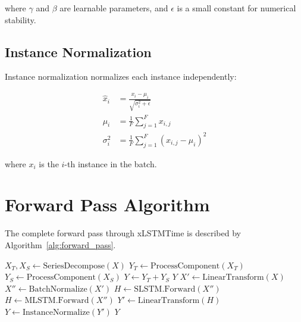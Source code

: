 \documentclass[11pt,a4paper]{article}
\begin{document}
where $\gamma$ and $\beta$ are learnable parameters, and $\epsilon$ is a small constant for numerical stability.

\subsection{Instance Normalization}

Instance normalization normalizes each instance independently:

\begin{align}
\hat{x}_i &= \frac{x_i - \mu_i}{\sqrt{\sigma_i^2 + \epsilon}} \label{eq:instance_norm_1} \\
\mu_i &= \frac{1}{F} \sum_{j=1}^{F} x_{i,j} \label{eq:instance_mean} \\
\sigma_i^2 &= \frac{1}{F} \sum_{j=1}^{F} (x_{i,j} - \mu_i)^2 \label{eq:instance_var}
\end{align}

where $x_i$ is the $i$-th instance in the batch.

\section{Forward Pass Algorithm}

The complete forward pass through xLSTMTime is described by Algorithm~\ref{alg:forward_pass}.

\begin{algorithm}[H]
\caption{xLSTMTime Forward Pass}
\label{alg:forward_pass}
\begin{algorithmic}[1]
    \State $X_T, X_S \gets \text{SeriesDecompose}(X)$ 
    \State $Y_T \gets \text{ProcessComponent}(X_T)$ 
    \State $Y_S \gets \text{ProcessComponent}(X_S)$ 
    \State $Y \gets Y_T + Y_S$ 
    \State \Return $Y$
\EndProcedure
{}
    \State $X' \gets \text{LinearTransform}(X)$ 
    \State $X'' \gets \text{BatchNormalize}(X')$ 
        \State $H \gets \text{SLSTM.Forward}(X'')$ 
    \Else
        \State $H \gets \text{MLSTM.Forward}(X'')$ 
    \EndIf
    \State $Y' \gets \text{LinearTransform}(H)$ 
    \State $Y \gets \text{InstanceNormalize}(Y')$ 
    \State \Return $Y$
\EndProcedure
\end{algorithmic}
\end{algorithm}
\end{document}
